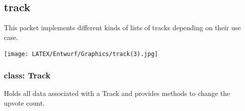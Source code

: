 \documentclass[oneside, ngerman]{sdqtechreport}
\begin{document}
\subsection{track}
This packet implements different kinds of lists of tracks depending on their use case.

\begin{center}
   \texttt{[image: LATEX/Entwurf/Graphics/track(3).jpg]} 
\end{center}


\subsubsection{class: Track}
Holds all data associated with a Track and provides methods to change the upvote count.
\end{document}
